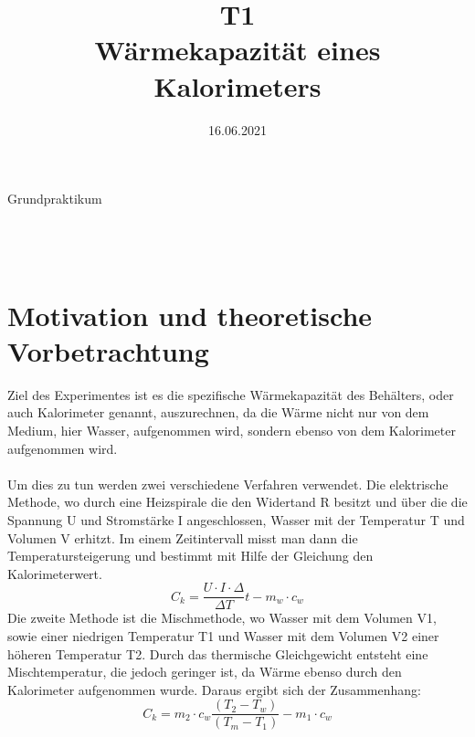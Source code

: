 \documentclass[bibliography=totocnumbered]{scrartcl}
\title{T1 \\ Wärmekapazität eines Kalorimeters}
\date{16.06.2021}
\begin{document}
	\begin{titlepage}
		\begin{center}
			{\huge{Grundpraktikum}}\\\vspace*{15mm}
			{\huge{\textbf{\thetitle}}}\\\vspace*{20mm}
			{\theauthor}\\\vspace*{10mm}
			{\thedate}\\\vspace*{40mm}
			
			
			
		\end{center}
	\end{titlepage}
	\makeatother
	\restoregeometry
	\newpage
	
	\tableofcontents
	\newpage
	
	\listoffigures 
	\listoftables
	\newpage
	
	
	
	\section{Motivation und theoretische Vorbetrachtung}
	
	Ziel des Experimentes ist es die spezifische Wärmekapazität des Behälters, oder auch Kalorimeter
	genannt, auszurechnen, da die Wärme nicht nur von dem Medium, hier Wasser, aufgenommen
	wird, sondern ebenso von dem Kalorimeter aufgenommen wird.
	\\
	\\
	Um dies zu tun werden zwei verschiedene Verfahren verwendet.
	Die elektrische Methode, wo durch eine Heizspirale die den Widertand R besitzt und über die die
	Spannung U und Stromstärke I angeschlossen, Wasser mit der Temperatur T und Volumen V erhitzt.
	Im einem Zeitintervall misst man dann die Temperatursteigerung und bestimmt mit Hilfe der
	Gleichung den Kalorimeterwert.
	\begin{equation}\label{eq: elektrische Methode}
	C_{k}	=\dfrac{U\cdot I \cdot \Delta}{\Delta T } t-m_{w}\cdot c_{w}
	\end{equation}
	Die zweite Methode ist die Mischmethode, wo Wasser mit dem Volumen V1, sowie einer niedrigen
	Temperatur T1 und Wasser mit dem Volumen V2 einer höheren Temperatur T2. Durch das
	thermische Gleichgewicht entsteht eine Mischtemperatur, die jedoch geringer ist, da Wärme ebenso
	durch den Kalorimeter aufgenommen wurde.
	Daraus ergibt sich der Zusammenhang:
	\begin{equation}\label{eq: Mischungsmethode}
		C_{k}=m_{2}\cdot c_{w}\dfrac{(T_{2}-T_{w})}{(T_{m}-T_{1}) }-m_{1}\cdot c_{w}
	\end{equation}
	
\end{document}
